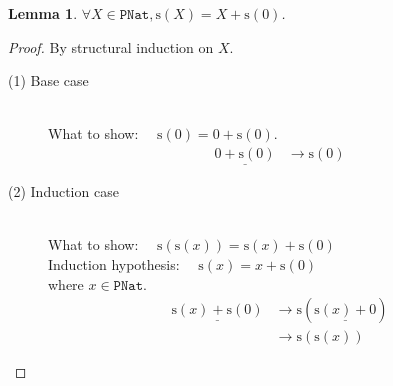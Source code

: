 \documentclass[12pt, a4paper]{article}
\newtheorem{lemma}[theorem]{Lemma}
\newcommand{\rel}[1]{\mathrel{#1}}
\newcommand{\rmx}[1]{\mathrm{#1}}
\newcommand{\larrow}{\longrightarrow}
\newcommand{\under}{\underline}
\begin{document}
\begin{lemma}
\label{lm2}
$\forall X \in \mathtt{PNat}, \rmx{s}(X) = X \rel{+} \rmx{s}(0)$.
\end{lemma}
\begin{proof}
By structural induction on $X$.

\begin{description}

\item[(1) Base case]~\\
\noindent
What to show: $\quad \rmx{s}(0) = 0 \rel{+} \rmx{s}(0)$.
\begin{align*}
\under{0 \rel{+} \rmx{s}(0)}
	&\larrow \rmx{s}(0) \tag{by +1}
\end{align*}

\item[(2) Induction case]~\\
What to show: $\quad \rmx{s}(\rmx{s}(x)) = \rmx{s}(x) \rel{+} \rmx{s}(0)$ \\
Induction hypothesis: $\quad \rmx{s}(x) = x \rel{+} \rmx{s}(0)$  \\
where $x \in \mathtt{PNat}$.
\begin{align*}
\under{\rmx{s}(x) \rel{+} \rmx{s}(0)}
	&\larrow \rmx{s}(\under{\rmx{s}(x) \rel{+} 0}) \tag{by Lemma 7 from Problem 1} \\
	&\larrow \rmx{s}(\rmx{s}(x)) \tag{by Lemma 6 from Problem 1}
\end{align*}

\end{description}
\end{proof}
\end{document}
